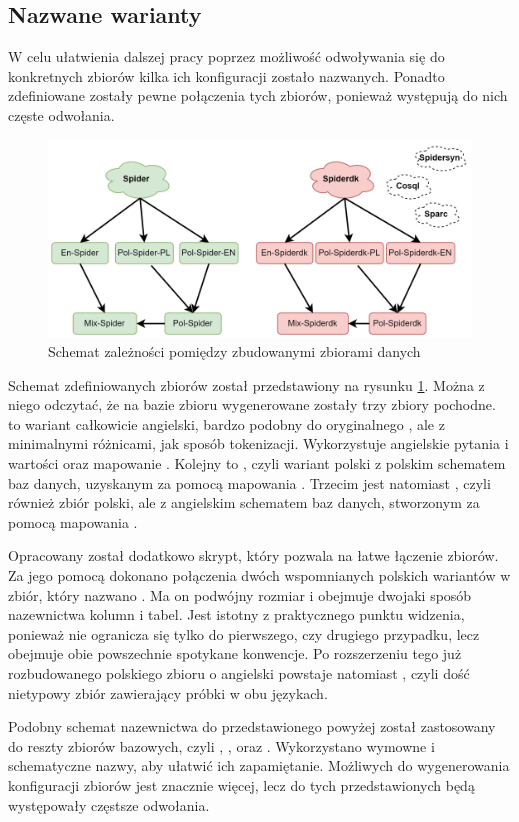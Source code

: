 \subsection{Nazwane warianty}

W celu ułatwienia dalszej pracy poprzez możliwość odwoływania się do konkretnych zbiorów kilka ich konfiguracji zostało nazwanych. Ponadto zdefiniowane zostały pewne połączenia tych zbiorów, ponieważ występują do nich częste odwołania.

\begin{figure}[ht!]
  \centering
  \includegraphics[width=1.0\linewidth]{images/datasets.png}
  \caption{Schemat zależności pomiędzy zbudowanymi zbiorami danych}
  \label{fig:datasets}
\end{figure}

Schemat zdefiniowanych zbiorów został przedstawiony na rysunku \ref{fig:datasets}. Można z niego odczytać, że na bazie zbioru  wygenerowane zostały trzy zbiory pochodne.  to wariant całkowicie angielski, bardzo podobny do oryginalnego , ale z minimalnymi różnicami, jak sposób tokenizacji. Wykorzystuje angielskie pytania i wartości oraz mapowanie . Kolejny to , czyli wariant polski z polskim schematem baz danych, uzyskanym za pomocą mapowania . Trzecim jest natomiast , czyli również zbiór polski, ale z angielskim schematem baz danych, stworzonym za pomocą mapowania .

Opracowany został dodatkowo skrypt, który pozwala na łatwe łączenie zbiorów. Za jego pomocą dokonano połączenia dwóch wspomnianych polskich wariantów w zbiór, który nazwano . Ma on podwójny rozmiar i obejmuje dwojaki sposób nazewnictwa kolumn i tabel. Jest istotny z praktycznego punktu widzenia, ponieważ nie ogranicza się tylko do pierwszego, czy drugiego przypadku, lecz obejmuje obie powszechnie spotykane konwencje. Po rozszerzeniu tego już rozbudowanego polskiego zbioru o angielski  powstaje natomiast , czyli dość nietypowy zbiór zawierający próbki w obu językach.

Podobny schemat nazewnictwa do przedstawionego powyżej został zastosowany do reszty zbiorów bazowych, czyli , ,  oraz . Wykorzystano wymowne i schematyczne nazwy, aby ułatwić ich zapamiętanie. Możliwych do wygenerowania konfiguracji zbiorów jest znacznie więcej, lecz do tych przedstawionych będą występowały częstsze odwołania.
